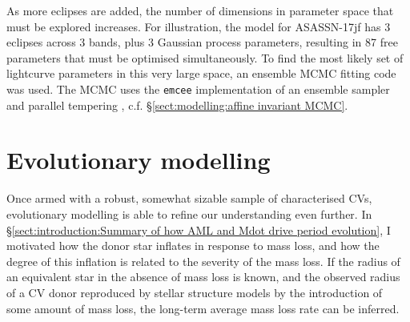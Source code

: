 As more eclipses are added, the number of dimensions in parameter space that must be explored increases. For illustration, the model for ASASSN-17jf has 3 eclipses across 3 bands, plus 3 Gaussian process parameters, resulting in 87 free parameters that must be optimised simultaneously. To find the most likely set of lightcurve parameters in this very large space, an ensemble MCMC fitting code was used. The MCMC uses the \texttt{emcee} implementation of an ensemble sampler and parallel tempering \citep{foreman2012}, c.f. \S\ref{sect:modelling:affine invariant MCMC}.



\section{Evolutionary modelling}\label{sect:method:evolutionary modelling}

Once armed with a robust, somewhat sizable sample of characterised CVs, evolutionary modelling is able to refine our understanding even further. In \S\ref{sect:introduction:Summary of how AML and Mdot drive period evolution}, I motivated how the donor star inflates in response to mass loss, and how the degree of this inflation is related to the severity of the mass loss.
If the radius of an equivalent star in the absence of mass loss is known, and the observed radius of a CV donor reproduced by stellar structure models by the introduction of some amount of mass loss, the long-term average mass loss rate can be inferred.

